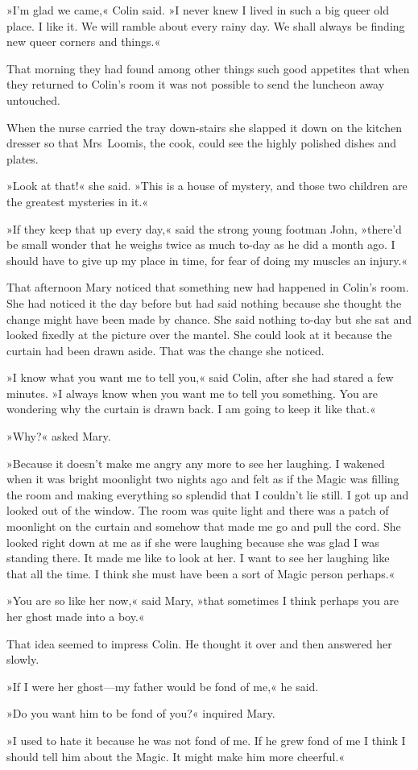 »I'm glad we came,« Colin said. »I never knew I lived in such a big queer old place. I like it. We will ramble about every rainy day. We shall always be finding new queer corners and things.«

That morning they had found among other things such good appetites that when they returned to Colin's room it was not possible to send the luncheon away untouched.

When the nurse carried the tray down-stairs she slapped it down on the kitchen dresser so that Mrs~Loomis, the cook, could see the highly polished dishes and plates.

»Look at that!« she said. »This is a house of mystery, and those two children are the greatest mysteries in it.«

»If they keep that up every day,« said the strong young footman John, »there'd be small wonder that he weighs twice as much to-day as he did a month ago. I should have to give up my place in time, for fear of doing my muscles an injury.«

That afternoon Mary noticed that something new had happened in Colin's room. She had noticed it the day before but had said nothing because she thought the change might have been made by chance. She said nothing to-day but she sat and looked fixedly at the picture over the mantel. She could look at it because the curtain had been drawn aside. That was the change she noticed.

»I know what you want me to tell you,« said Colin, after she had stared a few minutes. »I always know when you want me to tell you something. You are wondering why the curtain is drawn back. I am going to keep it like that.«

»Why?« asked Mary.

»Because it doesn't make me angry any more to see her laughing. I wakened when it was bright moonlight two nights ago and felt as if the Magic was filling the room and making everything so splendid that I couldn't lie still. I got up and looked out of the window. The room was quite light and there was a patch of moonlight on the curtain and somehow that made me go and pull the cord. She looked right down at me as if she were laughing because she was glad I was standing there. It made me like to look at her. I want to see her laughing like that all the time. I think she must have been a sort of Magic person perhaps.«

»You are so like her now,« said Mary, »that sometimes I think perhaps you are her ghost made into a boy.«

That idea seemed to impress Colin. He thought it over and then answered her slowly.

»If I were her ghost—my father would be fond of me,« he said.

»Do you want him to be fond of you?« inquired Mary.

»I used to hate it because he was not fond of me. If he grew fond of me I think I should tell him about the Magic. It might make him more cheerful.«